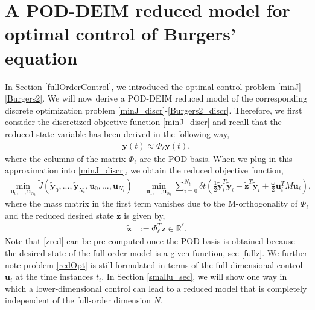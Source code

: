 \section{A POD-DEIM reduced model for optimal control of Burgers' equation}
\label{redOptimalControl}
In Section \ref{fullOrderControl}, we introduced the optimal control problem \eqref{minJ}-\eqref{Burgers2}. We will now derive a POD-DEIM reduced model of the corresponding discrete optimization problem \eqref{minJ_discr}-\eqref{Burgers2_discr}. Therefore, we first consider the discretized objective function \eqref{minJ_discr} and recall that the reduced state variable has been derived in the following way,
\begin{align*}
\mathbf{y}(t) \approx \Phi_\ell \mathbf{\tilde y}(t),
\end{align*}
where the columns of the matrix $\Phi_\ell$ are the POD basis. When we plug in this approximation into \eqref{minJ_discr}, we obtain the reduced objective function,
\begin{align}
\label{redOpt}
\min_{\mathbf{u}_0,...,\mathbf{u}_{N_t}} \tilde{J}(\mathbf{\tilde y}_0,...,\mathbf{\tilde y}_{N_t},\mathbf{u}_0,...,\mathbf{u}_{N_t}) = \min_{\mathbf{u}_1,...,\mathbf{u}_{N_t}} \sum_{i=0}^{N_t} \delta \! t \left( \frac{1}{2} \mathbf{\tilde y}_i^T \mathbf{\tilde y}_i - \mathbf{\tilde z}^T\mathbf{\tilde y}_i + \frac{\omega}{2}\mathbf{u}_i^T M \mathbf{u}_i \right),
\end{align}
where the mass matrix in the first term vanishes due to the M-orthogonality of $\Phi_\ell$ and the reduced desired state $\mathbf{\tilde z}$ is given by,
\begin{align}
\label{zred}
\mathbf{\tilde z} &:= \Phi_\ell^T \mathbf{z} \in \mathbb{R}^\ell.
\end{align}
Note that \eqref{zred} can be pre-computed once the POD basis is obtained because the desired state of the full-order model is a given function, see \eqref{fullz}. We further note problem \eqref{redOpt} is still formulated in terms of the full-dimensional control $\mathbf{u}_i$ at the time instances $t_i$. In Section \ref{smallu_sec}, we will show one way in which a lower-dimensional control can lead to a reduced model that is completely independent of the full-order dimension $N$.

